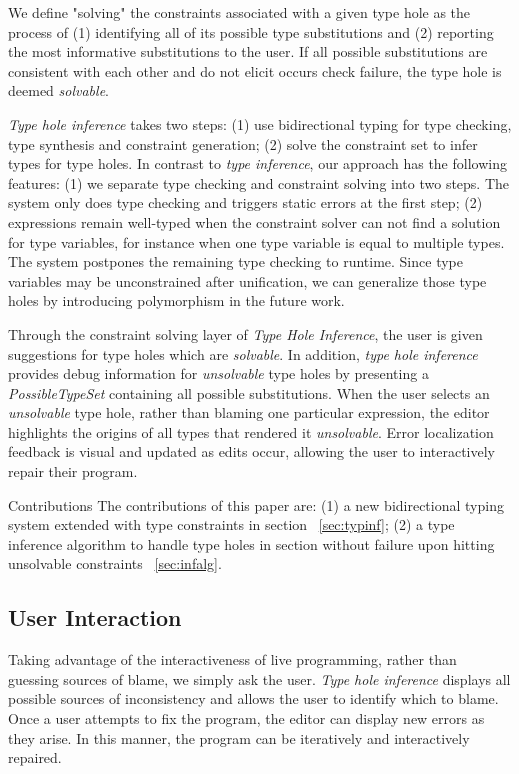 We define "solving" the constraints associated with a given type hole as the process of (1) identifying all of its possible type substitutions and (2) reporting the most informative substitutions to the user. If all possible substitutions are consistent with each other and do not elicit occurs check failure, the type hole is deemed \emph{solvable}.

\emph{Type hole inference} takes two steps: (1) use bidirectional typing for type checking, type synthesis and constraint generation; (2) solve the constraint set to infer types for type holes. In contrast to \emph{type inference}, our approach has the following features: (1) we separate type checking and constraint solving into two steps. The system only does type checking and triggers static errors at the first step; (2) expressions remain well-typed when the constraint solver can not find a solution for type variables, for instance when one type variable is equal to multiple types. The system postpones the remaining type checking to runtime. Since  type variables may be unconstrained after unification, we can generalize those type holes by introducing polymorphism in the future work. 

Through the constraint solving layer of \emph{Type Hole Inference}, the user is given suggestions for type holes which are \textit{solvable}. In addition, \emph{type hole inference} provides debug information for \emph{unsolvable} type holes by presenting a \emph{PossibleTypeSet} containing all possible substitutions. When the user selects an \emph{unsolvable} type hole, rather than blaming one particular expression, the editor highlights the origins of all types that rendered it \emph{unsolvable}. Error localization feedback is visual and updated as edits occur, allowing the user to interactively repair their program.

\par{Contributions} The contributions of this paper are: (1) a new bidirectional typing system extended with type constraints in section ~\ref{sec:typinf}; (2) a type inference algorithm to handle type holes in section without failure upon hitting unsolvable constraints ~\ref{sec:infalg}.

\subsection{User Interaction}

Taking advantage of the interactiveness of live programming, rather than guessing sources of blame, we simply ask the user. \emph{Type hole inference} displays all possible sources of inconsistency and allows the user to identify which to blame. Once a user attempts to fix the program, the editor can display new errors as they arise. In this manner, the program can be iteratively and interactively repaired. 

